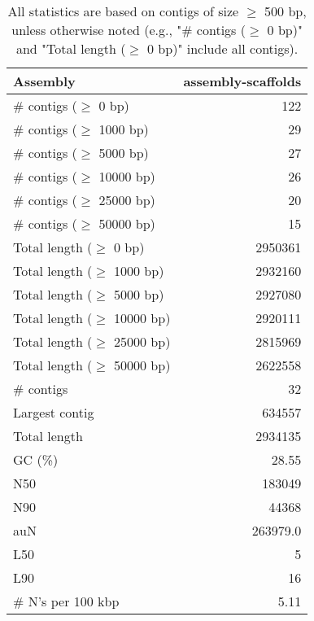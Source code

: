 \documentclass[12pt,a4paper]{article}
\begin{document}
\begin{table}[ht]
\begin{center}
\caption{All statistics are based on contigs of size $\geq$ 500 bp, unless otherwise noted (e.g., "\# contigs ($\geq$ 0 bp)" and "Total length ($\geq$ 0 bp)" include all contigs).}
\begin{tabular}{|l*{1}{|r}|}
\hline
Assembly & assembly-scaffolds \\ \hline
\# contigs ($\geq$ 0 bp) & 122 \\ \hline
\# contigs ($\geq$ 1000 bp) & 29 \\ \hline
\# contigs ($\geq$ 5000 bp) & 27 \\ \hline
\# contigs ($\geq$ 10000 bp) & 26 \\ \hline
\# contigs ($\geq$ 25000 bp) & 20 \\ \hline
\# contigs ($\geq$ 50000 bp) & 15 \\ \hline
Total length ($\geq$ 0 bp) & 2950361 \\ \hline
Total length ($\geq$ 1000 bp) & 2932160 \\ \hline
Total length ($\geq$ 5000 bp) & 2927080 \\ \hline
Total length ($\geq$ 10000 bp) & 2920111 \\ \hline
Total length ($\geq$ 25000 bp) & 2815969 \\ \hline
Total length ($\geq$ 50000 bp) & 2622558 \\ \hline
\# contigs & 32 \\ \hline
Largest contig & 634557 \\ \hline
Total length & 2934135 \\ \hline
GC (\%) & 28.55 \\ \hline
N50 & 183049 \\ \hline
N90 & 44368 \\ \hline
auN & 263979.0 \\ \hline
L50 & 5 \\ \hline
L90 & 16 \\ \hline
\# N's per 100 kbp & 5.11 \\ \hline
\end{tabular}
\end{center}
\end{table}
\end{document}
